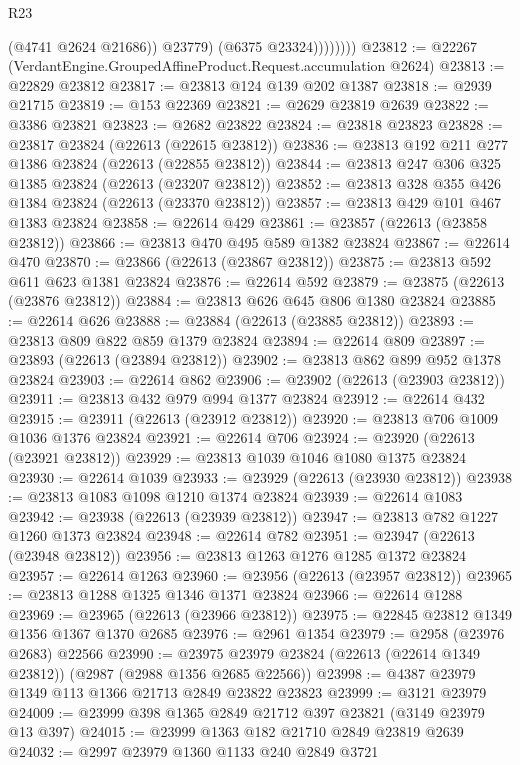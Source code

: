 \begin{lexlean}{R23}
\begin{coremodule}
                      (@4741 @2624 @21686))
                    @23779)
                  (@6375 @23324))))))))
@23812 := @22267 (VerdantEngine.GroupedAffineProduct.Request.accumulation @2624)
@23813 := @22829 @23812
@23817 := @23813 @124 @139 @202 @1387
@23818 := @2939 @21715
@23819 := @153 @22369
@23821 := @2629 @23819 @2639
@23822 := @3386 @23821
@23823 := @2682 @23822
@23824 := @23818 @23823
@23828 := @23817 @23824 (@22613 (@22615 @23812))
@23836 := @23813 @192 @211 @277 @1386 @23824 (@22613 (@22855 @23812))
@23844 := @23813 @247 @306 @325 @1385 @23824 (@22613 (@23207 @23812))
@23852 := @23813 @328 @355 @426 @1384 @23824 (@22613 (@23370 @23812))
@23857 := @23813 @429 @101 @467 @1383 @23824
@23858 := @22614 @429
@23861 := @23857 (@22613 (@23858 @23812))
@23866 := @23813 @470 @495 @589 @1382 @23824
@23867 := @22614 @470
@23870 := @23866 (@22613 (@23867 @23812))
@23875 := @23813 @592 @611 @623 @1381 @23824
@23876 := @22614 @592
@23879 := @23875 (@22613 (@23876 @23812))
@23884 := @23813 @626 @645 @806 @1380 @23824
@23885 := @22614 @626
@23888 := @23884 (@22613 (@23885 @23812))
@23893 := @23813 @809 @822 @859 @1379 @23824
@23894 := @22614 @809
@23897 := @23893 (@22613 (@23894 @23812))
@23902 := @23813 @862 @899 @952 @1378 @23824
@23903 := @22614 @862
@23906 := @23902 (@22613 (@23903 @23812))
@23911 := @23813 @432 @979 @994 @1377 @23824
@23912 := @22614 @432
@23915 := @23911 (@22613 (@23912 @23812))
@23920 := @23813 @706 @1009 @1036 @1376 @23824
@23921 := @22614 @706
@23924 := @23920 (@22613 (@23921 @23812))
@23929 := @23813 @1039 @1046 @1080 @1375 @23824
@23930 := @22614 @1039
@23933 := @23929 (@22613 (@23930 @23812))
@23938 := @23813 @1083 @1098 @1210 @1374 @23824
@23939 := @22614 @1083
@23942 := @23938 (@22613 (@23939 @23812))
@23947 := @23813 @782 @1227 @1260 @1373 @23824
@23948 := @22614 @782
@23951 := @23947 (@22613 (@23948 @23812))
@23956 := @23813 @1263 @1276 @1285 @1372 @23824
@23957 := @22614 @1263
@23960 := @23956 (@22613 (@23957 @23812))
@23965 := @23813 @1288 @1325 @1346 @1371 @23824
@23966 := @22614 @1288
@23969 := @23965 (@22613 (@23966 @23812))
@23975 := @22845 @23812 @1349 @1356 @1367 @1370 @2685
@23976 := @2961 @1354
@23979 := @2958 (@23976 @2683) @22566
@23990 := @23975 @23979 @23824 (@22613 (@22614 @1349 @23812)) (@2987 (@2988 @1356 @2685 @22566))
@23998 := @4387 @23979 @1349 @113 @1366 @21713 @2849 @23822 @23823
@23999 := @3121 @23979
@24009 := @23999 @398 @1365 @2849 @21712 @397 @23821 (@3149 @23979 @13 @397)
@24015 := @23999 @1363 @182 @21710 @2849 @23819 @2639
@24032 := @2997
    @23979
    @1360
    @1133
    @240
    @2849
    @3721

\end{coremodule}
\end{lexlean}
